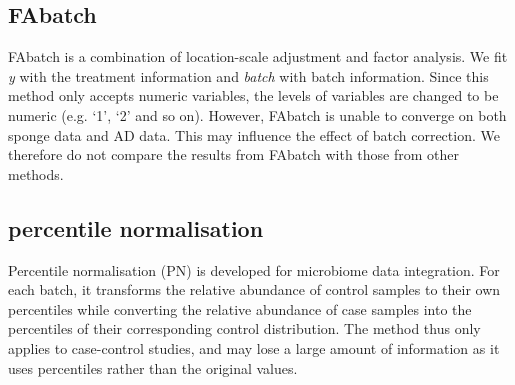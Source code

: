 \documentclass[]{book}
\newenvironment{Shaded}{\begin{snugshade}}{\end{snugshade}}
\newcommand{\KeywordTok}[1]{\textcolor[rgb]{0.13,0.29,0.53}{\textbf{#1}}}
\newcommand{\DataTypeTok}[1]{\textcolor[rgb]{0.13,0.29,0.53}{#1}}
\newcommand{\StringTok}[1]{\textcolor[rgb]{0.31,0.60,0.02}{#1}}
\newcommand{\CommentTok}[1]{\textcolor[rgb]{0.56,0.35,0.01}{\textit{#1}}}
\newcommand{\OperatorTok}[1]{\textcolor[rgb]{0.81,0.36,0.00}{\textbf{#1}}}
\newcommand{\NormalTok}[1]{#1}
\begin{document}
\subsection{FAbatch}\label{fabatch}

FAbatch is a combination of location-scale adjustment and factor
analysis. We fit \emph{y} with the treatment information and
\emph{batch} with batch information. Since this method only accepts
numeric variables, the levels of variables are changed to be numeric
(e.g. `1', `2' and so on). However, FAbatch is unable to converge on
both sponge data and AD data. This may influence the effect of batch
correction. We therefore do not compare the results from FAbatch with
those from other methods.

\begin{Shaded}
\end{Shaded}

\subsection{percentile normalisation}\label{percentile-normalisation}

Percentile normalisation (PN) is developed for microbiome data
integration. For each batch, it transforms the relative abundance of
control samples to their own percentiles while converting the relative
abundance of case samples into the percentiles of their corresponding
control distribution. The method thus only applies to case-control
studies, and may lose a large amount of information as it uses
percentiles rather than the original values.
\end{document}
